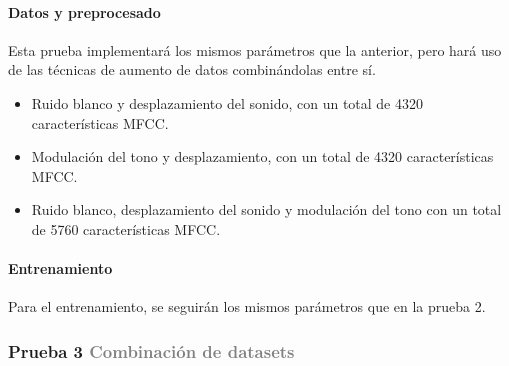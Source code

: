 \documentclass[11pt,a4paper,spanish]{book}
\begin{document}
	\hfill\begin{minipage}[t]{\dimexpr\textwidth-1cm}
		\paragraph{Datos y preprocesado}Esta prueba implementará los mismos parámetros que la anterior, pero hará uso de las técnicas de aumento de datos combinándolas entre sí.
		\begin{itemize}
			\item Ruido blanco y desplazamiento del sonido, con un total de 4320 características MFCC.
			
			\item Modulación del tono y desplazamiento, con un total de 4320 características MFCC.
			
			\item Ruido blanco, desplazamiento del sonido y modulación del tono con un total de 5760 características MFCC.
		\end{itemize}
	
	
		\paragraph{Entrenamiento} Para el entrenamiento, se seguirán los mismos parámetros que en la prueba 2.
		
	\end{minipage}

	\subsubsection[]{\large Prueba 3 {\normalsize \textcolor{Gray}{Combinación de datasets}}}
	
\end{document}
